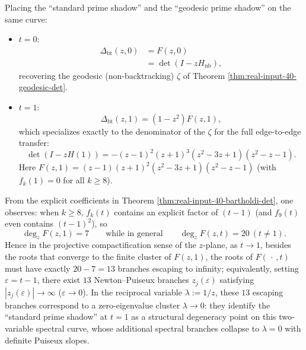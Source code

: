 \begin{remark}\label{rem:real-input-40-bartholdi-specializations}
Placing the ``standard prime shadow'' and the ``geodesic prime shadow'' on the same curve:
\begin{itemize}
  \item \textbf{\(t=0\)}:
  \[
  \begin{aligned}
  \Delta_{\mathrm{bt}}(z,0)&=F(z,0)\\
  &=\det(I-zH_{\mathrm{nb}}),
  \end{aligned}
  \]
  recovering the geodesic (non-backtracking) \(\zeta\) of Theorem \ref{thm:real-input-40-geodesic-det}.
  \item \textbf{\(t=1\)}:
  \[
  \Delta_{\mathrm{bt}}(z,1)=(1-z^2)F(z,1),
  \]
  which specializes exactly to the denominator of the \(\zeta\) for the full edge-to-edge transfer:
  \[
  \det(I-zH(1))
  =-(z-1)^2(z+1)^3(z^2-3z+1)(z^2-z-1).
  \]
  Here \(F(z,1)=(z-1)(z+1)^2(z^2-3z+1)(z^2-z-1)\) (with \(f_k(1)=0\) for all \(k\ge 8\)).
\end{itemize}
\end{remark}

\begin{remark}\label{rem:real-input-40-bartholdi-infinite-root-cluster}
From the explicit coefficients in Theorem \ref{thm:real-input-40-bartholdi-det}, one observes: when \(k\ge 8\), \(f_k(t)\) contains an explicit factor of \((t-1)\) (and \(f_9(t)\) even contains \((t-1)^2\)), so
\[
\deg_z F(z,1)=7
\qquad\text{while in general}\qquad
\deg_z F(z,t)=20\ (t\neq 1).
\]
Hence in the projective compactification sense of the \(z\)-plane, as \(t\to 1\), besides the roots that converge to the finite cluster of \(F(z,1)\), the roots of \(F(\,\cdot\,,t)\) must have exactly \(20-7=13\) branches escaping to infinity;
equivalently, setting \(\varepsilon=t-1\), there exist \(13\) Newton--Puiseux branches \(z_j(\varepsilon)\) satisfying \(|z_j(\varepsilon)|\to\infty\) (\(\varepsilon\to 0\)).
In the reciprocal variable \(\lambda:=1/z\), these \(13\) escaping branches correspond to a zero-eigenvalue cluster \(\lambda\to 0\): they identify the ``standard prime shadow'' at \(t=1\) as a structural degeneracy point on this two-variable spectral curve, whose additional spectral branches collapse to \(\lambda=0\) with definite Puiseux slopes.
\end{remark}

